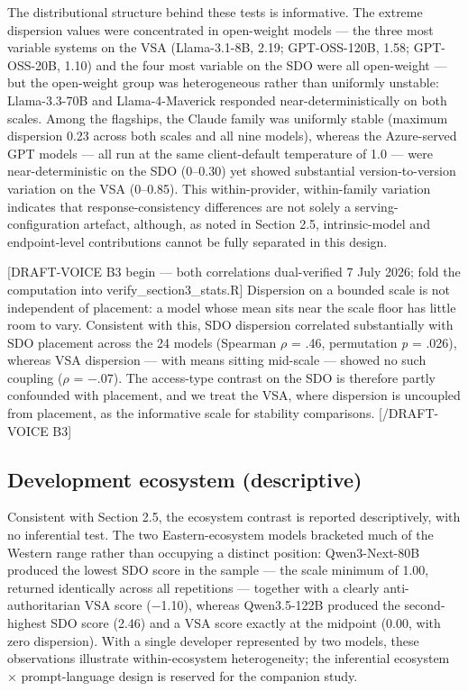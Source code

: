 \documentclass[
]{article}
\begin{document}
The distributional structure behind these tests is informative. The
extreme dispersion values were concentrated in open-weight models ---
the three most variable systems on the VSA (Llama-3.1-8B, 2.19;
GPT-OSS-120B, 1.58; GPT-OSS-20B, 1.10) and the four most variable on the
SDO were all open-weight --- but the open-weight group was heterogeneous
rather than uniformly unstable: Llama-3.3-70B and Llama-4-Maverick
responded near-deterministically on both scales. Among the flagships,
the Claude family was uniformly stable (maximum dispersion 0.23 across
both scales and all nine models), whereas the Azure-served GPT models
--- all run at the same client-default temperature of 1.0 --- were
near-deterministic on the SDO (0--0.30) yet showed substantial
version-to-version variation on the VSA (0--0.85). This within-provider,
within-family variation indicates that response-consistency differences
are not solely a serving-configuration artefact, although, as noted in
Section 2.5, intrinsic-model and endpoint-level contributions cannot be
fully separated in this design.

{[}DRAFT-VOICE B3 begin --- both correlations dual-verified 7 July 2026;
fold the computation into verify\_section3\_stats.R{]} Dispersion on a
bounded scale is not independent of placement: a model whose mean sits
near the scale floor has little room to vary. Consistent with this, SDO
dispersion correlated substantially with SDO placement across the 24
models (Spearman \(\rho\) = .46, permutation \emph{p} = .026), whereas
VSA dispersion --- with means sitting mid-scale --- showed no such
coupling (\(\rho\) = −.07). The access-type contrast on the SDO is
therefore partly confounded with placement, and we treat the VSA, where
dispersion is uncoupled from placement, as the informative scale for
stability comparisons. {[}/DRAFT-VOICE B3{]}

\subsection{Development ecosystem
(descriptive)}\label{development-ecosystem-descriptive}

Consistent with Section 2.5, the ecosystem contrast is reported
descriptively, with no inferential test. The two Eastern-ecosystem
models bracketed much of the Western range rather than occupying a
distinct position: Qwen3-Next-80B produced the lowest SDO score in the
sample --- the scale minimum of 1.00, returned identically across all
repetitions --- together with a clearly anti-authoritarian VSA score
(−1.10), whereas Qwen3.5-122B produced the second-highest SDO score
(2.46) and a VSA score exactly at the midpoint (0.00, with zero
dispersion). With a single developer represented by two models, these
observations illustrate within-ecosystem heterogeneity; the inferential
ecosystem × prompt-language design is reserved for the companion study.
\end{document}
